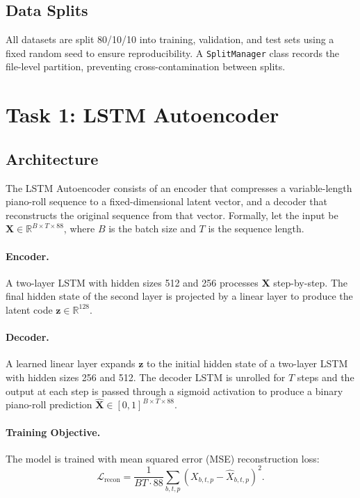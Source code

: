 \documentclass{article}
\begin{document}
\subsection{Data Splits}

All datasets are split 80/10/10 into training, validation, and test sets using a fixed random seed to ensure reproducibility. A \texttt{SplitManager} class records the file-level partition, preventing cross-contamination between splits.

\section{Task 1: LSTM Autoencoder}
\label{sec:task1}

\subsection{Architecture}

The LSTM Autoencoder consists of an encoder that compresses a variable-length piano-roll sequence to a fixed-dimensional latent vector, and a decoder that reconstructs the original sequence from that vector. Formally, let the input be $\mathbf{X} \in \mathbb{R}^{B \times T \times 88}$, where $B$ is the batch size and $T$ is the sequence length.

\paragraph{Encoder.}
A two-layer LSTM with hidden sizes 512 and 256 processes $\mathbf{X}$ step-by-step. The final hidden state of the second layer is projected by a linear layer to produce the latent code $\mathbf{z} \in \mathbb{R}^{128}$.

\paragraph{Decoder.}
A learned linear layer expands $\mathbf{z}$ to the initial hidden state of a two-layer LSTM with hidden sizes 256 and 512. The decoder LSTM is unrolled for $T$ steps and the output at each step is passed through a sigmoid activation to produce a binary piano-roll prediction $\hat{\mathbf{X}} \in [0,1]^{B \times T \times 88}$.

\paragraph{Training Objective.}
The model is trained with mean squared error (MSE) reconstruction loss:
\begin{equation}
  \mathcal{L}_{\text{recon}} = \frac{1}{BT \cdot 88} \sum_{b,t,p} \left( X_{b,t,p} - \hat{X}_{b,t,p} \right)^2.
\end{equation}
\end{document}
